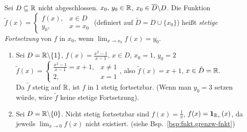 \documentclass[12pt]{scrreprt}
\begin{document}
\begin{dfn}\label{dfn:fnkt.stetige-forts}
Sei $D\subseteq\mathbb{R}$ nicht abgeschlossen. $x_0,\,y_0\in\mathbb{R}$, $x_0\in\overline{D}\backslash D$. Die Funktion
$\tilde{f}(x) = \begin{cases}
f(x), &x\in D\\
y_0, & x = x_0
\end{cases}$ (definiert auf $\tilde{D} = D\cup\{x_0\}$) heißt \emph{stetige Fortsetzung} von $f$ in $x_0$, wenn $\lim_{x\to x_0} f(x) = y_0$.
\end{dfn}

\begin{bsp}\label{bsp:fnkt.stetige-forts}
\begin{enumerate}
\item Sei $D=\mathbb{R}\backslash\{1\}$, $f(x)=\frac{x^2-1}{x-1}$, $x\in D$, $x_0=1$, $y_0=2$\\
\folgt $\tilde{f}(x)=\begin{cases}
\frac{x^2-1}{x-1} = x+1, &x\ne 1\\
2, & x=1
\end{cases}$, also $\tilde{f}(x) = x+1$, $x\in\tilde{D}=\mathbb{R}.$\\
Da $\tilde{f}$ stetig auf $\mathbb{R}$, ist $f$ in 1 stetig fortsetzbar. (Wenn man $y_0=3$ setzen würde, wäre $\tilde{f}$ keine
stetige Fortsetzung).\label{bsp:fnkt.stetige-forts.a}
\item Sei $D=\mathbb{R}\backslash\{0\}$. Nicht stetig fortsetzbar sind $f(x)=\frac{1}{x}$, $f(x)=\mathbf{1}_{\mathbb{R}_+}(x)$, 
da jeweils $\lim_{x\to 0}f(x)$ nicht existiert. (siehe Bsp.~\ref{bsp:fnkt.grenzw-fnkt})\label{bsp:fnkt.stetige-forts.b}
\end{enumerate}
\end{bsp}
\end{document}
